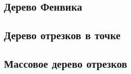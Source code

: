 \subsection{Дерево Фенвика}

\subsection{Дерево отрезков в точке}

\subsection{Массовое дерево отрезков}


